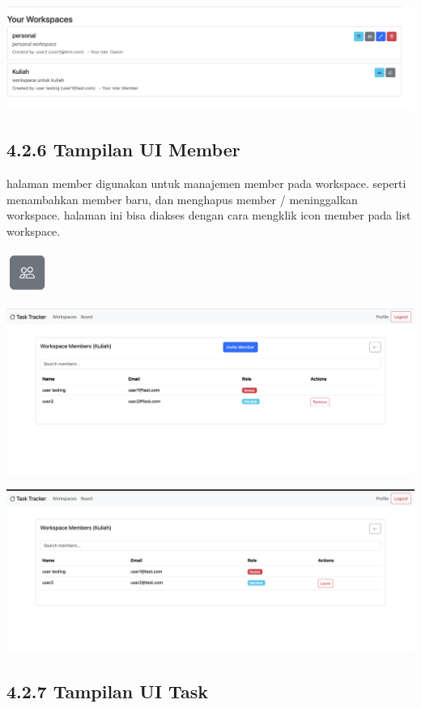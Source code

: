 \begin{center}
  \includegraphics[width=1\textwidth]{assets/ui/workspace_list_row.png}
\end{center}

\subsection*{4.2.6 Tampilan UI Member}
halaman member digunakan untuk manajemen member pada workspace.
seperti menambahkan member baru, dan menghapus member / meninggalkan workspace.
halaman ini bisa diakses dengan cara mengklik icon member pada list workspace.
\begin{center}
  \includegraphics[width=0.1\textwidth]{assets/ui/workspace_member_icon.png}
\end{center}
\begin{center}
  \includegraphics[width=1\textwidth]{assets/ui/list_member.png}
\end{center}
\begin{center}
  \includegraphics[width=1\textwidth]{assets/ui/list_member_other_user.png}
\end{center}










\subsection*{4.2.7 Tampilan UI Task}
